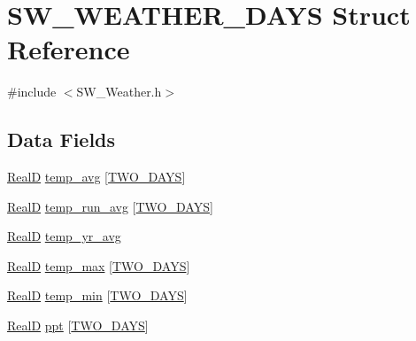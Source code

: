 \hypertarget{struct_s_w___w_e_a_t_h_e_r__2_d_a_y_s}{}\section{S\+W\+\_\+\+W\+E\+A\+T\+H\+E\+R\+\_\+D\+A\+YS Struct Reference}
\label{struct_s_w___w_e_a_t_h_e_r__2_d_a_y_s}


{\ttfamily \#include $<$S\+W\+\_\+\+Weather.\+h$>$}

\subsection*{Data Fields}
\begin{DoxyCompactItemize}
\item 
\hyperlink{generic_8h_af1c105fd5732f70b91ddaeda0cc340e3}{RealD} \hyperlink{struct_s_w___w_e_a_t_h_e_r__2_d_a_y_s_a75fdbfbedf39e4df22d75e6fbe99287d}{temp\+\_\+avg} \mbox{[}\hyperlink{_s_w___defines_8h_aa13584938d6d242c32df06115a94b01a}{T\+W\+O\+\_\+\+D\+A\+YS}\mbox{]}
\item 
\hyperlink{generic_8h_af1c105fd5732f70b91ddaeda0cc340e3}{RealD} \hyperlink{struct_s_w___w_e_a_t_h_e_r__2_d_a_y_s_a2798e58bd5807bcb620ea55861db54ed}{temp\+\_\+run\+\_\+avg} \mbox{[}\hyperlink{_s_w___defines_8h_aa13584938d6d242c32df06115a94b01a}{T\+W\+O\+\_\+\+D\+A\+YS}\mbox{]}
\item 
\hyperlink{generic_8h_af1c105fd5732f70b91ddaeda0cc340e3}{RealD} \hyperlink{struct_s_w___w_e_a_t_h_e_r__2_d_a_y_s_a833e32d3c690e4c8d0941514a87afbff}{temp\+\_\+yr\+\_\+avg}
\item 
\hyperlink{generic_8h_af1c105fd5732f70b91ddaeda0cc340e3}{RealD} \hyperlink{struct_s_w___w_e_a_t_h_e_r__2_d_a_y_s_a9b735922ec9885da9efd16dd6722fb05}{temp\+\_\+max} \mbox{[}\hyperlink{_s_w___defines_8h_aa13584938d6d242c32df06115a94b01a}{T\+W\+O\+\_\+\+D\+A\+YS}\mbox{]}
\item 
\hyperlink{generic_8h_af1c105fd5732f70b91ddaeda0cc340e3}{RealD} \hyperlink{struct_s_w___w_e_a_t_h_e_r__2_d_a_y_s_a7353c64d2f60af0cba687656c5fb5fd0}{temp\+\_\+min} \mbox{[}\hyperlink{_s_w___defines_8h_aa13584938d6d242c32df06115a94b01a}{T\+W\+O\+\_\+\+D\+A\+YS}\mbox{]}
\item 
\hyperlink{generic_8h_af1c105fd5732f70b91ddaeda0cc340e3}{RealD} \hyperlink{struct_s_w___w_e_a_t_h_e_r__2_d_a_y_s_ae49402c75209c707546186af06576491}{ppt} \mbox{[}\hyperlink{_s_w___defines_8h_aa13584938d6d242c32df06115a94b01a}{T\+W\+O\+\_\+\+D\+A\+YS}\mbox{]}

\end{DoxyCompactItemize}
